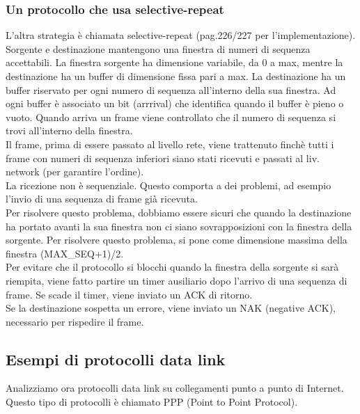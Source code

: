 \documentclass{article}
\begin{document}
\subsubsection{Un protocollo che usa selective-repeat}
L'altra strategia è chiamata selective-repeat (pag.226/227 per l'implementazione).\\
Sorgente e destinazione mantengono una finestra di numeri di sequenza accettabili. La finestra sorgente ha dimensione variabile, da 0 a max, mentre la destinazione ha un buffer di dimensione fissa pari a max. La destinazione ha un buffer riservato per ogni numero di sequenza all'interno della sua finestra. Ad ogni buffer  è associato un bit (arrrival) che identifica quando il buffer è pieno o vuoto. Quando arriva un frame viene controllato che il numero di sequenza si trovi all'interno della finestra. \\
Il frame, prima di essere passato al livello rete, viene trattenuto finchè tutti i frame con numeri di sequenza inferiori siano stati ricevuti e passati al liv. network (per garantire l'ordine). \\
La ricezione non è sequenziale. Questo comporta a dei problemi, ad esempio l'invio di una sequenza di frame già ricevuta.\\
Per risolvere questo problema, dobbiamo essere sicuri che quando la destinazione ha portato avanti la sua finestra non ci siano sovrapposizioni con la finestra della sorgente. Per risolvere questo problema, si pone come dimensione massima della finestra (MAX\_SEQ+1)/2.\\
Per evitare che il protocollo si blocchi quando la finestra della sorgente si sarà riempita, viene fatto partire un timer ausiliario dopo l'arrivo di una sequenza di frame. Se scade il timer, viene inviato un ACK di ritorno.\\
Se la destinazione sospetta un errore, viene inviato un NAK (negative ACK), necessario per rispedire il frame.
\subsection{Esempi di protocolli data link}
Analizziamo ora protocolli data link su collegamenti punto a punto di Internet. Questo tipo di protocolli è chiamato PPP (Point to Point Protocol).\\
\end{document}
